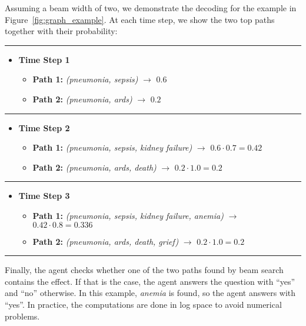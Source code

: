   Assuming a beam width of two, we demonstrate the decoding for the example in Figure~\ref{fig:graph_example}. At each time step, we show
  the two top paths together with their probability:
  \par\noindent\rule{\textwidth}{0.4pt}
  \begin{itemize}
		\item \textbf{Time Step 1}
        \begin{itemize}
          \item \textbf{Path 1:} \textit{(pneumonia, sepsis)} $\rightarrow$ $0.6$
          \item	\textbf{Path 2:} \textit{(pneumonia, ards)} $\rightarrow$ $0.2$
        \end{itemize}
	\end{itemize}
  \par\noindent\rule{\textwidth}{0.4pt}
  \begin{itemize}
		\item \textbf{Time Step 2}
        \begin{itemize}
          \item	\textbf{Path 1:} \textit{(pneumonia, sepsis, kidney failure)} $\rightarrow$ $0.6 \cdot 0.7 = 0.42$
          \item	\textbf{Path 2:} \textit{(pneumonia, ards, death)} $\rightarrow$ $0.2 \cdot 1.0 = 0.2$
        \end{itemize}
	\end{itemize}
  \par\noindent\rule{\textwidth}{0.4pt}
  \begin{itemize}
		\item \textbf{Time Step 3}
        \begin{itemize}
          \item	\textbf{Path 1:} \textit{(pneumonia, sepsis, kidney failure, anemia)} $\rightarrow$ $0.42 \cdot 0.8 = 0.336$
          \item	\textbf{Path 2:} \textit{(pneumonia, ards, death, grief)} $\rightarrow$ $0.2 \cdot 1.0 = 0.2$
        \end{itemize}
	\end{itemize}
  \par\noindent\rule{\textwidth}{0.4pt}

  Finally, the agent checks whether one of the two paths found by beam search contains the 
  effect. If that is the case, the agent answers the question with ``yes'' and ``no'' otherwise.
In this example, \textit{anemia} is found, so the agent answers with ``yes''.
In practice, the computations are done in log space to avoid numerical problems.

